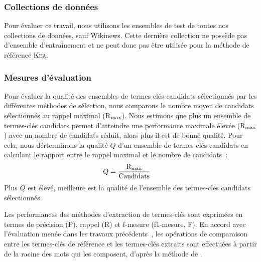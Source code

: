       \subsubsection{Collections de données}
      \label{subsubsec:main:domain_independent_keyphrase_extraction-keyphrase_candidate_selection-evaluation-evaluation_data}
        Pour évaluer ce travail, nous utilisons les ensembles de test de toutes
        nos collections de données, sauf Wikinews. Cette dernière collection ne
        possède pas d'ensemble d'entraînement et ne peut donc pas être utilisée
        pour la méthode de référence \textsc{Kea}.
      
      \subsubsection{Mesures d'évaluation}
      \label{subsubsec:main:domain_independent_keyphrase_extraction-keyphrase_candidate_selection-evaluation-evaluation_measures}
        Pour évaluer la qualité des ensembles de termes-clés candidats
        sélectionnés par les différentes méthodes de sélection, nous comparons
        le nombre moyen de candidats sélectionnés au rappel maximal
        (R$_\textnormal{max}$). Nous estimons que plus un ensemble de
        termes-clés candidats permet d'atteindre une performance maximale élevée
        (R$_\textnormal{max}$) avec un nombre de candidats réduit, alors plus il
        est de bonne qualité. Pour cela, nous dérterminons la qualité $Q$ d'un
        ensemble de termes-clés candidats en calculant le rapport entre le
        rappel maximal et le nombre de candidats~:
        \begin{align}
          Q &= \frac{\textnormal{R}_{\textnormal{max}}}{\textnormal{Candidats}}
        \end{align}
        Plus $Q$ est élevé, meilleure est la qualité de l'ensemble des
        termes-clés candidats sélectionnés.

        Les performances des méthodes d'extraction de termes-clés sont exprimées
        en termes de précision (P), rappel (R) et f-mesure (f1-mesure, F). En
        accord avec l'évaluation menée dans les travaux
        précédents~\cite{kim2010semeval}, les opérations de comparaison entre
        les termes-clés de référence et les termes-clés extraits sont effectuées
        à partir de la racine des mots qui les composent, d'après la méthode de
        .

